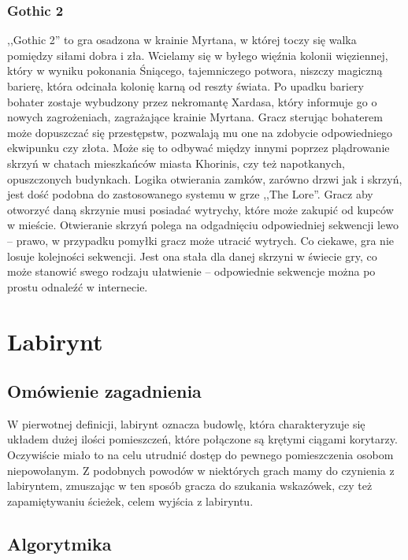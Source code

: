 \documentclass[oneside,polski,logo]{amuthesis}
\begin{document}
\subsubsection{Gothic 2}
\par ,,Gothic 2'' to gra osadzona w krainie Myrtana, w której toczy się walka pomiędzy siłami dobra i zła. Wcielamy się w byłego więźnia kolonii więziennej, który w wyniku pokonania Śniącego, tajemniczego potwora, niszczy magiczną barierę, która odcinała kolonię karną od reszty świata. Po upadku bariery bohater zostaje wybudzony przez nekromantę Xardasa, który informuje go o nowych zagrożeniach, zagrażające krainie Myrtana. Gracz sterując bohaterem może dopuszczać się przestępstw, pozwalają mu one na zdobycie odpowiedniego ekwipunku czy złota. Może się to odbywać między innymi poprzez plądrowanie skrzyń w chatach mieszkańców miasta Khorinis, czy też napotkanych, opuszczonych budynkach. 
Logika otwierania zamków, zarówno drzwi jak i skrzyń, jest dość podobna do zastosowanego systemu w grze ,,The Lore''. Gracz aby otworzyć daną skrzynie musi posiadać wytrychy, które może zakupić od kupców w mieście. Otwieranie skrzyń polega na odgadnięciu odpowiedniej sekwencji lewo – prawo, w przypadku pomyłki gracz może utracić wytrych. Co ciekawe, gra nie losuje kolejności sekwencji. Jest ona stała dla danej skrzyni w świecie gry, co może stanowić swego rodzaju ułatwienie – odpowiednie sekwencje można po prostu odnaleźć w internecie.


\section{Labirynt}
\subsection{Omówienie zagadnienia}
\par W pierwotnej definicji, labirynt oznacza budowlę, która charakteryzuje się układem dużej ilości pomieszczeń, które połączone są krętymi ciągami korytarzy. Oczywiście miało to na celu utrudnić dostęp do pewnego pomieszczenia osobom niepowołanym. Z podobnych powodów w niektórych grach mamy do czynienia z labiryntem, zmuszając w ten sposób gracza do szukania wskazówek, czy też zapamiętywaniu ścieżek, celem wyjścia z labiryntu. 
\subsection{Algorytmika}
\end{document}
